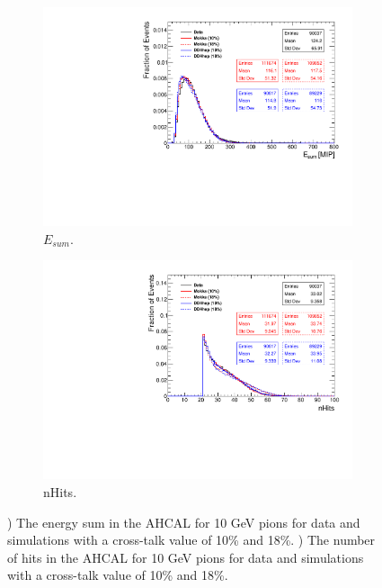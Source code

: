 \begin{figure}[htbp!]
  \centering
  \begin{subfigure}[t]{0.49\textwidth}
    \includegraphics[width=1.\linewidth]{chap5/fig_AHCAL_Timing/Pions/Comparison_EnergySum_Xtalk_pions10GeV.pdf}
    \caption{$E_{sum}$.} \label{fig:pi10Evis}
  \end{subfigure}
  \hfill
  \begin{subfigure}[t]{0.49\textwidth}
    \includegraphics[width=1.\linewidth]{chap5/fig_AHCAL_Timing/Pions/Comparison_nHits_Xtalk_pions10GeV.pdf}
    \caption{nHits.} \label{fig:pi10nHits}
  \end{subfigure}
  \caption{) The energy sum in the AHCAL for 10 GeV pions for data and simulations with a cross-talk value of 10\% and 18\%. ) The number of hits in the AHCAL for 10 GeV pions for data and simulations with a cross-talk value of 10\% and 18\%.}
  \label{fig:pi10Val}
\end{figure}

